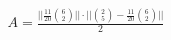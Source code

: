 \documentclass[preview]{standalone}
\begin{document}
\begin{align*}
A=\frac{||\frac{11}{20}\binom{6}{2}|| \cdot ||\binom{2}{5}-\frac{11}{20}\binom{6}{2}||}{2}
\end{align*}
\end{document}
